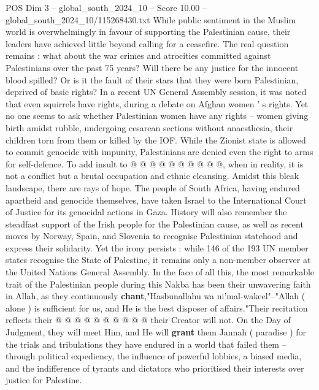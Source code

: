 \begin{textsample}{POS Dim 3 – global\_south\_2024\_10 – Score 10.00 – global\_south\_2024\_10/115268430.txt}
While public sentiment in the Muslim world is overwhelmingly in favour of supporting the Palestinian cause, their leaders have achieved little beyond calling for a ceasefire.
The real question remains : what about the war crimes and atrocities committed against Palestinians over the past 75 years?
Will there be any justice for the innocent blood spilled?
Or is it the fault of their stars that they were born Palestinian, deprived of basic rights?
In a recent UN General Assembly session, it was noted that even squirrels have rights, during a debate on Afghan women ' s rights.
Yet no one seems to ask whether Palestinian women have any rights -- women giving birth amidst rubble, undergoing cesarean sections without anaesthesia, their children torn from them or killed by the IOF.
While the Zionist state is allowed to commit genocide with impunity, Palestinians are denied even the right to arms for self-defence.
To add insult to @ @ @ @ @ @ @ @ @ @, when in reality, it is not a conflict but a brutal occupation and ethnic cleansing.
Amidst this bleak landscape, there are rays of hope.
The people of South Africa, having endured apartheid and genocide themselves, have taken Israel to the International Court of Justice for its genocidal actions in Gaza.
History will also remember the steadfast support of the Irish people for the Palestinian cause, as well as recent moves by Norway, Spain, and Slovenia to recognise Palestinian statehood and express their solidarity.
Yet the irony persists : while 146 of the 193 UN member states recognise the State of Palestine, it remains only a non-member observer at the United Nations General Assembly.
In the face of all this, the most remarkable trait of the Palestinian people during this Nakba has been their unwavering faith in Allah, as they continuously \textbf{chant},"Hasbunallahu wa ni'mal-wakeel"--"Allah ( alone ) is sufficient for us, and He is the best disposer of affairs."Their recitation reflects their @ @ @ @ @ @ @ @ @ @ their Creator will not.
On the Day of Judgment, they will meet Him, and He will \textbf{grant} them Jannah ( paradise ) for the trials and tribulations they have endured in a world that failed them -- through political expediency, the influence of powerful lobbies, a biased media, and the indifference of tyrants and dictators who prioritised their interests over justice for Palestine.

\end{textsample}
